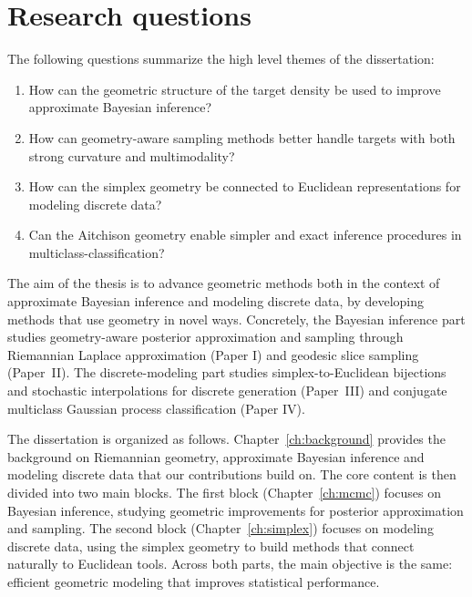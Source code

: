 \section*{Research questions} 
The following questions summarize the high level themes of the dissertation:
\begin{enumerate}
    \item How can the geometric structure of the target density be used to improve approximate Bayesian inference?
    \item How can geometry-aware sampling methods better handle targets with both strong curvature and multimodality?
    \item How can the simplex geometry be connected to Euclidean representations for modeling discrete data?
    \item Can the Aitchison geometry enable simpler and exact inference procedures in multiclass-classification?
\end{enumerate}


The aim of the thesis is to advance geometric methods both in the context of approximate Bayesian inference and modeling discrete data, by developing methods that use geometry in novel ways. Concretely, the Bayesian inference part studies geometry-aware posterior approximation and sampling through Riemannian Laplace approximation (Paper I) and geodesic slice sampling (Paper~II). The discrete-modeling part studies simplex-to-Euclidean bijections and stochastic interpolations for discrete generation (Paper~III) and conjugate multiclass Gaussian process classification (Paper IV).


The dissertation is organized as follows. Chapter~\ref{ch:background} provides the background on  Riemannian geometry, approximate Bayesian inference and modeling discrete data that our contributions build on. 
The core content is then divided into two main blocks. 
The first block (Chapter~\ref{ch:mcmc}) focuses on Bayesian inference, studying geometric improvements for posterior approximation and sampling. The second block (Chapter~\ref{ch:simplex}) focuses on modeling discrete data, using the simplex geometry to build methods that connect naturally to Euclidean tools. Across both parts, the main objective is the same: efficient geometric modeling that improves statistical performance.


